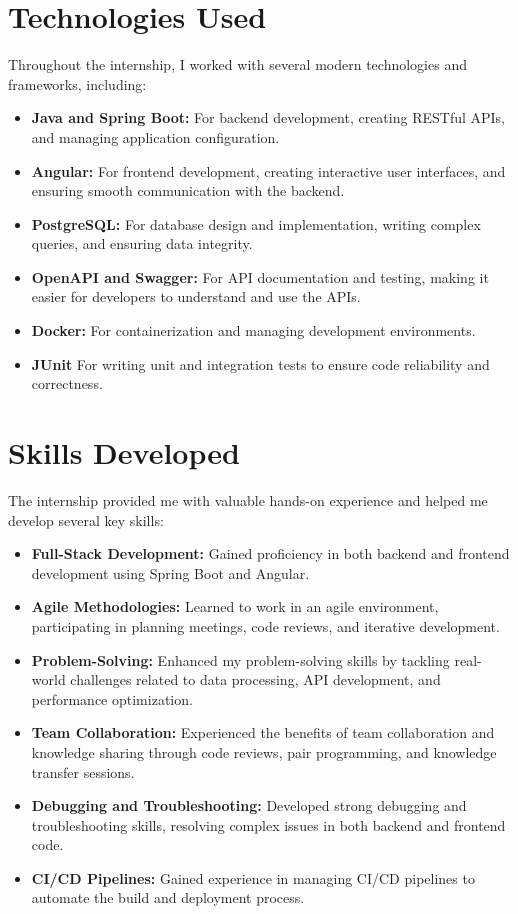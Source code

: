 \documentclass[openany, 11pt]{report} %
\begin{document}
\section{Technologies Used}
Throughout the internship, I worked with several modern technologies and frameworks, including:
\begin{itemize}
    \item \textbf{Java and Spring Boot:} For backend development, creating RESTful APIs, and managing application configuration.
    \item \textbf{Angular:} For frontend development, creating interactive user interfaces, and ensuring smooth communication with the backend.
    \item \textbf{PostgreSQL:} For database design and implementation, writing complex queries, and ensuring data integrity.
    \item \textbf{OpenAPI and Swagger:} For API documentation and testing, making it easier for developers to understand and use the APIs.
    \item \textbf{Docker:} For containerization and managing development environments.
    \item \textbf{JUnit} For writing unit and integration tests to ensure code reliability and correctness.
\end{itemize}

\section{Skills Developed}
The internship provided me with valuable hands-on experience and helped me develop several key skills:
\begin{itemize}
    \item \textbf{Full-Stack Development:} Gained proficiency in both backend and frontend development using Spring Boot and Angular.
    \item \textbf{Agile Methodologies:} Learned to work in an agile environment, participating in planning meetings, code reviews, and iterative development.
    \item \textbf{Problem-Solving:} Enhanced my problem-solving skills by tackling real-world challenges related to data processing, API development, and performance optimization.
    \item \textbf{Team Collaboration:} Experienced the benefits of team collaboration and knowledge sharing through code reviews, pair programming, and knowledge transfer sessions.
    \item \textbf{Debugging and Troubleshooting:} Developed strong debugging and troubleshooting skills, resolving complex issues in both backend and frontend code.
    \item \textbf{CI/CD Pipelines:} Gained experience in managing CI/CD pipelines to automate the build and deployment process.
\end{itemize}
\end{document}

